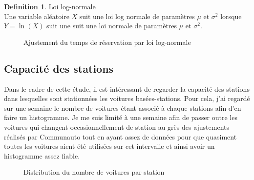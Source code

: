 \documentclass[12pt,a4paper]{article}
\theoremstyle{definition}
\newtheorem{definition}{Definition}
\begin{document}
{\begin{definition}{Loi log-normale}\\
Une variable aléatoire $X$ suit une loi log normale de paramètres $\mu$ et $\sigma^2$ lorsque $Y = \ln(X)$ suit une suit une loi normale de paramètres $\mu$ et $\sigma^2$.
\end{definition}


\begin{figure}[!h]
\centering
{}
\caption{Ajustement du temps de réservation par loi log-normale}
\end{figure}

\subsection{Capacité des stations}
Dans le cadre de cette étude, il est intéressant de regarder la capacité des stations dans lesquelles sont stationnées les voitures basées-stations.
Pour cela, j'ai regardé sur une semaine le nombre de voitures étant associé à chaque stations afin d'en faire un histogramme. Je me suis limité à une semaine afin de passer outre les voitures qui changent occasionnellement de station au grès des ajustements réalisés par Communauto tout en ayant assez de données pour que quasiment toutes les voitures aient été utilisées sur cet intervalle et ainsi avoir un histogramme assez fiable.

\begin{figure}[!h]
\centering
{}
\caption{Distribution du nombre de voitures par station}
\label{hist_capa}
\end{figure}


}
\end{document}
